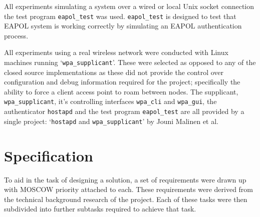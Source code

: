 \documentclass[pdftex, 12pt, a4paper]{article}
\begin{document}

All experiments simulating a system over a wired or local Unix socket connection the test program \verb`eapol_test` was used. \verb`eapol_test` is designed to test that EAPOL system is working correctly by simulating an EAPOL authentication process.

All experiments using a real wireless network were conducted with Linux machines running `\verb`wpa_supplicant`'. These were selected as opposed to any of the closed source implementations as these did not provide the control over configuration and debug information required for the project; specifically the ability to force a client access point to roam between nodes.  The supplicant, \verb`wpa_supplicant`, it's controlling interfaces \verb`wpa_cli` and \verb`wpa_gui`, the authenticator \verb`hostapd` and the test program \verb`eapol_test` are all provided by a single project: `\verb`hostapd` and \verb`wpa_supplicant`' by Jouni Malinen et al\cite{wpa-hostapd}.

\section{Specification}
To aid in the task of designing a solution, a set of  requirements were drawn up with MOSCOW priority attached to each. These requirements were derived from the technical background research of the project.  Each of these tasks were then subdivided into further subtasks required to achieve that task.
\end{document}
